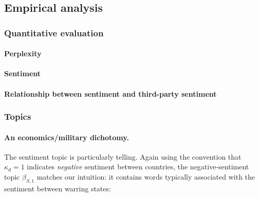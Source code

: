 \subsection*{Empirical analysis}

\subsubsection*{Quantitative evaluation}
\paragraph{Perplexity}
\paragraph{Sentiment}

\paragraph{Relationship between sentiment and third-party sentiment}

\subsubsection*{Topics}

\paragraph{An economics/military dichotomy.}
The sentiment topic is particularly telling.  Again using the
convention that $\kappa_d=1$ indicates \emph{negative} sentiment
between countries, the negative-sentiment topic $\beta_{S,1}$ matches
our intuition: it contains words typically associated with the
sentiment between warring states:


